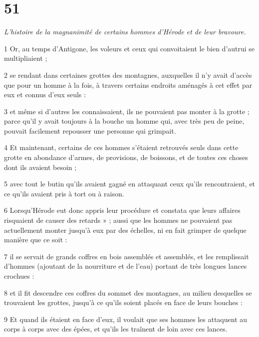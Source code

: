 \chapter{51}

\par \textit{L'histoire de la magnanimité de certains hommes d'Hérode et de leur bravoure.}

\par 1 Or, au temps d'Antigone, les voleurs et ceux qui convoitaient le bien d'autrui se multipliaient ;

\par 2 se rendant dans certaines grottes des montagnes, auxquelles il n'y avait d'accès que pour un homme à la fois, à travers certains endroits aménagés à cet effet par eux et connus d'eux seuls :

\par 3 et même si d'autres les connaissaient, ils ne pouvaient pas monter à la grotte ; parce qu'il y avait toujours à la bouche un homme qui, avec très peu de peine, pouvait facilement repousser une personne qui grimpait.

\par 4 Et maintenant, certains de ces hommes s'étaient retrouvés seuls dans cette grotte en abondance d'armes, de provisions, de boissons, et de toutes ces choses dont ils avaient besoin ;

\par 5 avec tout le butin qu'ils avaient gagné en attaquant ceux qu'ils rencontraient, et ce qu'ils avaient pris à tort ou à raison.

\par 6 Lorsqu'Hérode eut donc appris leur procédure et constata que leurs affaires risquaient de causer des retards » ; aussi que les hommes ne pouvaient pas actuellement monter jusqu'à eux par des échelles, ni en fait grimper de quelque manière que ce soit :

\par 7 il se servait de grands coffres en bois assemblés et assemblés, et les remplissait d'hommes (ajoutant de la nourriture et de l'eau) portant de très longues lances crochues :

\par 8 et il fit descendre ces coffres du sommet des montagnes, au milieu desquelles se trouvaient les grottes, jusqu'à ce qu'ils soient placés en face de leurs bouches :

\par 9 Et quand ils étaient en face d'eux, il voulait que ses hommes les attaquent au corps à corps avec des épées, et qu'ils les traînent de loin avec ces lances.

